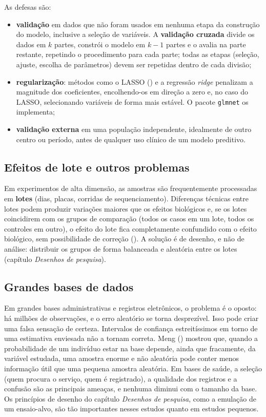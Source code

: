 \documentclass[
]{book}
\providecommand{\tightlist}{%
  \setlength{\itemsep}{0pt}\setlength{\parskip}{0pt}}
\begin{document}
As defesas são:

\begin{itemize}
\tightlist
\item
  \textbf{validação} em dados que não foram usados em nenhuma etapa da construção do modelo, inclusive a seleção de variáveis. A \textbf{validação cruzada} divide os dados em \(k\) partes, constrói o modelo em \(k - 1\) partes e o avalia na parte restante, repetindo o procedimento para cada parte; todas as etapas (seleção, ajuste, escolha de parâmetros) devem ser repetidas dentro de cada divisão;
\item
  \textbf{regularização}: métodos como o LASSO () e a regressão \emph{ridge} penalizam a magnitude dos coeficientes, encolhendo-os em direção a zero e, no caso do LASSO, selecionando variáveis de forma mais estável. O pacote \texttt{glmnet} os implementa;
\item
  \textbf{validação externa} em uma população independente, idealmente de outro centro ou período, antes de qualquer uso clínico de um modelo preditivo.
\end{itemize}

\subsection{Efeitos de lote e outros problemas}\label{efeitos-de-lote-e-outros-problemas}

Em experimentos de alta dimensão, as amostras são frequentemente processadas em \textbf{lotes} (dias, placas, corridas de sequenciamento). Diferenças técnicas entre lotes podem produzir variações maiores que os efeitos biológicos e, se os lotes coincidirem com os grupos de comparação (todos os casos em um lote, todos os controles em outro), o efeito do lote fica completamente confundido com o efeito biológico, sem possibilidade de correção (). A solução é de desenho, e não de análise: distribuir os grupos de forma balanceada e aleatória entre os lotes (capítulo \emph{Desenhos de pesquisa}).

\subsection{Grandes bases de dados}\label{grandes-bases-de-dados}

Em grandes bases administrativas e registros eletrônicos, o problema é o oposto: há milhões de observações, e o erro aleatório se torna desprezível. Isso pode criar uma falsa sensação de certeza. Intervalos de confiança estreitíssimos em torno de uma estimativa enviesada não a tornam correta. Meng () mostrou que, quando a probabilidade de um indivíduo estar na base depende, ainda que fracamente, da variável estudada, uma amostra enorme e não aleatória pode conter menos informação útil que uma pequena amostra aleatória. Em bases de saúde, a seleção (quem procura o serviço, quem é registrado), a qualidade dos registros e a confusão são as principais ameaças, e nenhuma diminui com o tamanho da base. Os princípios de desenho do capítulo \emph{Desenhos de pesquisa}, como a emulação de um ensaio-alvo, são tão importantes nesses estudos quanto em estudos pequenos.
\end{document}
